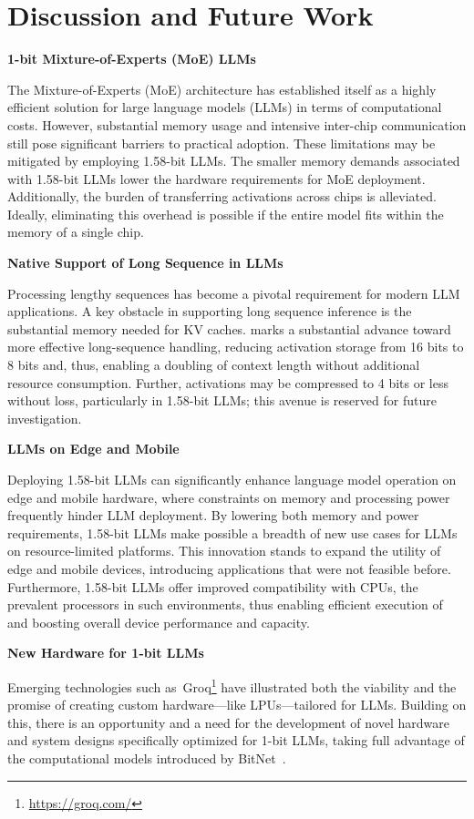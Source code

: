 \section{Discussion and Future Work}

\textbf{1-bit Mixture-of-Experts (MoE) LLMs}

The Mixture-of-Experts (MoE) architecture has established itself as a highly efficient solution for large language models (LLMs) in terms of computational costs. However, substantial memory usage and intensive inter-chip communication still pose significant barriers to practical adoption. These limitations may be mitigated by employing 1.58-bit LLMs. The smaller memory demands associated with 1.58-bit LLMs lower the hardware requirements for MoE deployment. Additionally, the burden of transferring activations across chips is alleviated. Ideally, eliminating this overhead is possible if the entire model fits within the memory of a single chip.

\textbf{Native Support of Long Sequence in LLMs}

Processing lengthy sequences has become a pivotal requirement for modern LLM applications. A key obstacle in supporting long sequence inference is the substantial memory needed for KV caches.  marks a substantial advance toward more effective long-sequence handling, reducing activation storage from 16 bits to 8 bits and, thus, enabling a doubling of context length without additional resource consumption. Further, activations may be compressed to 4 bits or less without loss, particularly in 1.58-bit LLMs; this avenue is reserved for future investigation.

\textbf{LLMs on Edge and Mobile}

Deploying 1.58-bit LLMs can significantly enhance language model operation on edge and mobile hardware, where constraints on memory and processing power frequently hinder LLM deployment. By lowering both memory and power requirements, 1.58-bit LLMs make possible a breadth of new use cases for LLMs on resource-limited platforms. This innovation stands to expand the utility of edge and mobile devices, introducing applications that were not feasible before. Furthermore, 1.58-bit LLMs offer improved compatibility with CPUs, the prevalent processors in such environments, thus enabling efficient execution of  and boosting overall device performance and capacity.

\textbf{New Hardware for 1-bit LLMs}

Emerging technologies such as~Groq\footnote{\url{https://groq.com/}} have illustrated both the viability and the promise of creating custom hardware—like LPUs—tailored for LLMs. Building on this, there is an opportunity and a need for the development of novel hardware and system designs specifically optimized for 1-bit LLMs, taking full advantage of the computational models introduced by BitNet~\cite{bitnet}.

